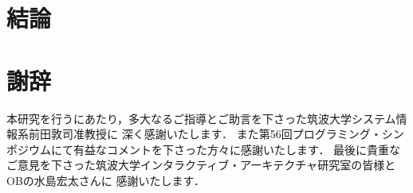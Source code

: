 \documentclass[a4paper,11pt,dvipdfmx]{jreport}
\makeatletter
\renewenvironment{thebibliography}[1]%
{\chapter*{\bibname\@mkboth{\bibname}{\bibname}}%
	\addcontentsline{toc}{chapter}{\numberline{}\bibname}%
	\list{\@biblabel{\@arabic\c@enumiv}}%
	{\settowidth\labelwidth{\@biblabel{#1}}%
		\leftmargin\labelwidth
		\advance\leftmargin\labelsep
		\@openbib@code
		\usecounter{enumiv}%
		\let\p@enumiv\@empty
		\renewcommand\theenumiv{\@arabic\c@enumiv}}%
	\sloppy
	\clubpenalty4000
	\@clubpenalty\clubpenalty
	\widowpenalty4000%
	\sfcode`\.\@m}
{\def\@noitemerr
	{\@latex@warning{Empty `thebibliography' environment}}%
	\endlist}
\makeatother
\begin{document}
\chapter{結論}
\label{chapter:conclusion}


\chapter*{謝辞}

本研究を行うにあたり，多大なるご指導とご助言を下さった筑波大学システム情報系前田敦司准教授に
深く感謝いたします．
また第56回プログラミング・シンポジウムにて有益なコメントを下さった方々に感謝いたします．
最後に貴重なご意見を下さった筑波大学インタラクティブ・アーキテクチャ研究室の皆様とOBの水島宏太さんに
感謝いたします．

\newpage

\renewcommand{\bibname}{参考文献}




%
%
\end{document}
